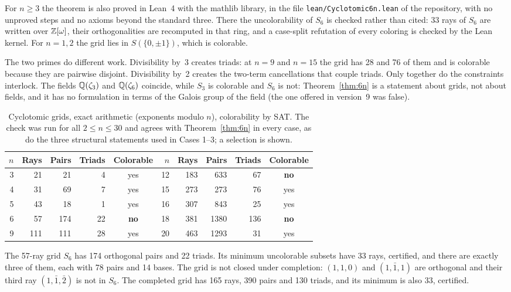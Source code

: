 For $n\ge3$ the theorem is also proved in Lean~4 with the mathlib library, in the file
\texttt{lean/Cyclotomic6n.lean} of the repository, with no unproved steps and no axioms
beyond the standard three.  There the uncolorability of $S_6$ is checked rather than cited: 33 rays of $S_6$ are
written over $\mathbb{Z}[\omega]$, their orthogonalities are recomputed in that ring, and a case-split
refutation of every coloring is checked by the Lean kernel.  For $n=1,2$ the grid lies in
$S(\{0,\pm1\})$, which is colorable.

The two primes do different work.  Divisibility by~3 creates triads: at $n=9$ and $n=15$ the grid
has 28 and 76 of them and is colorable because they are pairwise disjoint.  Divisibility by~2
creates the two-term cancellations that couple triads.  Only together do the constraints
interlock.  The fields $\mathbb{Q}(\zeta_3)$ and $\mathbb{Q}(\zeta_6)$ coincide, while $S_3$ is colorable and
$S_6$ is not: Theorem~\ref{thm:6n} is a statement about grids, not about fields, and it has
no formulation in terms of the Galois group of the field (the one offered in version~9 was
false).

\begin{table}[t]
\centering
\caption{Cyclotomic grids, exact arithmetic (exponents modulo $n$), colorability by SAT.  The
check was run for all $2\le n\le30$ and agrees with Theorem~\ref{thm:6n} in every case, as do the
three structural statements used in Cases 1--3; a selection is shown.}
\label{tab:cyc}
\begin{tabular}{rrrrc@{\qquad\qquad}rrrrc}
\toprule
$n$ & Rays & Pairs & Triads & Colorable & $n$ & Rays & Pairs & Triads & Colorable\\
\midrule
3 & 21 & 21 & 4 & yes & 12 & 183 & 633 & 67 & \textbf{no}\\
4 & 31 & 69 & 7 & yes & 15 & 273 & 273 & 76 & yes\\
5 & 43 & 18 & 1 & yes & 16 & 307 & 843 & 25 & yes\\
6 & 57 & 174 & 22 & \textbf{no} & 18 & 381 & 1380 & 136 & \textbf{no}\\
9 & 111 & 111 & 28 & yes & 20 & 463 & 1293 & 31 & yes\\
\bottomrule
\end{tabular}
\end{table}

\begin{fact}\label{fact:eisenstein}
The 57-ray grid $S_6$ has 174 orthogonal pairs and 22 triads.  Its minimum uncolorable subsets
have 33 rays, certified, and there are exactly three of them, each with 78 pairs and 14 bases.
The grid is not closed under completion: $(1,1,0)$ and $(1,\bar1,1)$ are orthogonal and their
third ray $(1,\bar1,\bar2)$ is not in $S_6$.  The completed grid has 165 rays, 390 pairs and 130
triads, and its minimum is also 33, certified.
\end{fact}

